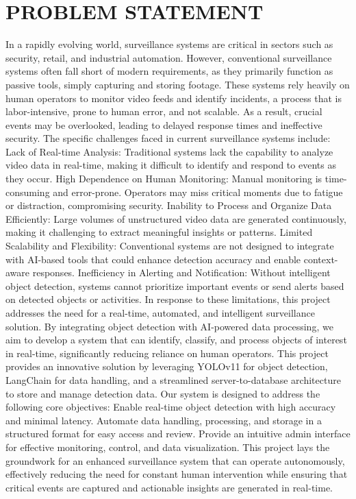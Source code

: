 \documentclass[12pt]{report}
\begin{document}
\section{PROBLEM STATEMENT}
In a rapidly evolving world, surveillance systems are critical in sectors such as security, retail, and industrial automation. However, conventional surveillance systems often fall short of modern requirements, as they primarily function as passive tools, simply capturing and storing footage. These systems rely heavily on human operators to monitor video feeds and identify incidents, a process that is labor-intensive, prone to human error, and not scalable. As a result, crucial events may be overlooked, leading to delayed response times and ineffective security.
The specific challenges faced in current surveillance systems include:
Lack of Real-time Analysis: Traditional systems lack the capability to analyze video data in real-time, making it difficult to identify and respond to events as they occur.
High Dependence on Human Monitoring: Manual monitoring is time-consuming and error-prone. Operators may miss critical moments due to fatigue or distraction, compromising security.
Inability to Process and Organize Data Efficiently: Large volumes of unstructured video data are generated continuously, making it challenging to extract meaningful insights or patterns.
Limited Scalability and Flexibility: Conventional systems are not designed to integrate with AI-based tools that could enhance detection accuracy and enable context-aware responses.
Inefficiency in Alerting and Notification: Without intelligent object detection, systems cannot prioritize important events or send alerts based on detected objects or activities.
In response to these limitations, this project addresses the need for a real-time, automated, and intelligent surveillance solution. By integrating object detection with AI-powered data processing, we aim to develop a system that can identify, classify, and process objects of interest in real-time, significantly reducing reliance on human operators. This project provides an innovative solution by leveraging YOLOv11 for object detection, LangChain for data handling, and a streamlined server-to-database architecture to store and manage detection data.
Our system is designed to address the following core objectives:
Enable real-time object detection with high accuracy and minimal latency.
Automate data handling, processing, and storage in a structured format for easy access and review.
Provide an intuitive admin interface for effective monitoring, control, and data visualization.
This project lays the groundwork for an enhanced surveillance system that can operate autonomously, effectively reducing the need for constant human intervention while ensuring that critical events are captured and actionable insights are generated in real-time.
\end{document}
